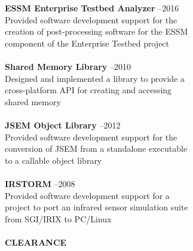 \documentclass{article}
\begin{document}
\begin{tabbing}
\>\textbf{ESSM Enterprise Testbed Analyzer}           --2016            \\
\>Provided software development support for the                               \\
\>creation of post-processing software for the ESSM                           \\
\>component of the Enterprise Testbed project                                 \\
                                                                              \\
\>\textbf{Shared Memory Library}                      --2010            \\
\>Designed and implemented a library to provide a                             \\
\>cross-platform API for creating and accessing                               \\
\>shared memory                                                               \\
                                                                              \\
\>\textbf{JSEM Object Library}                        --2012            \\
\>Provided software development support for the                               \\
\>conversion of JSEM from a standalone executable                             \\
\>to a callable object library                                                \\
                                                                              \\
\>\textbf{IRSTORM}                                    --2008            \\
\>Provided software development support for a                                 \\
\>project to port an infrared sensor simulation suite                         \\
\>from SGI/IRIX to PC/Linux                                                   \\
                                                                              \\
\textbf{CLEARANCE}                                                            \\
                                                                              \\

\end{tabbing}
\end{document}
